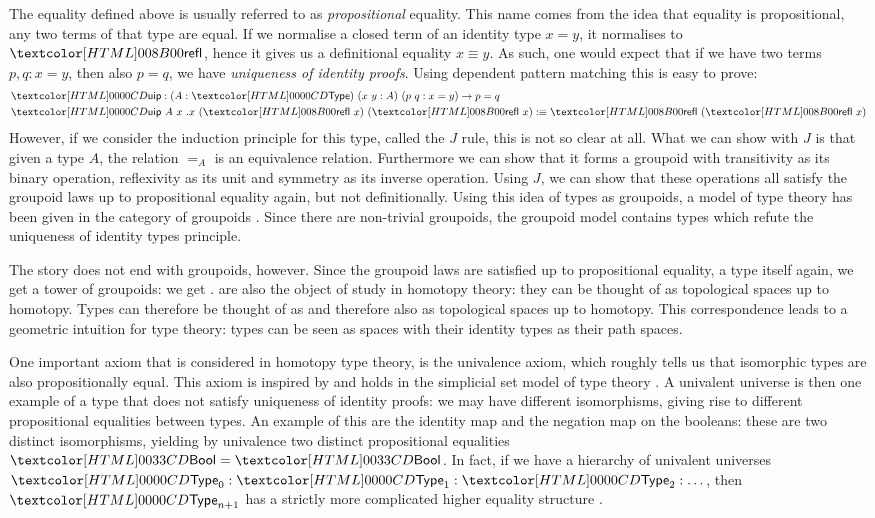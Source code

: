 The equality defined above is usually referred to as
\emph{propositional} equality. This name comes from the idea that
equality is propositional, \ie any two terms of that type are
equal. If we normalise a closed term of an identity type $x = y$, it
normalises to $\refl$, hence it gives us a definitional equality
$x \equiv y$. As such, one would expect that if we have two terms
$p, q : x = y$, then also $p = q$, \ie we have \emph{uniqueness of
  identity proofs}. Using dependent pattern matching this is easy to
prove:
%
\begin{align*}
  &\uip : (A : \Type)\ (x\ y : A)\ (p\ q : x = y) \to p = q \\
  &\uip\ A\ x\ .x\ (\refl\ x)\ (\refl\ x) \ddefeq \refl\ (\refl\ x)
\end{align*}
%
However, if we consider the induction principle for this type, called
the $J$ rule, this is not so clear at all. What we can show with $J$
is that given a type $A$, the relation $=_A$ is an equivalence
relation. Furthermore we can show that it forms a groupoid with
transitivity as its binary operation, reflexivity as its unit and
symmetry as its inverse operation. Using $J$, we can show that these
operations all satisfy the groupoid laws up to propositional equality
again, but not definitionally. Using this idea of types as groupoids,
a model of type theory has been given in the category of groupoids
\cite{Hofmann1998}. Since there are non-trivial groupoids, the
groupoid model contains types which refute the uniqueness of identity
types principle.

The story does not end with groupoids, however. Since the groupoid
laws are satisfied up to propositional equality, a type itself again,
we get a tower of groupoids: we get \inftygrpds. \inftygrpds are also
the object of study in homotopy theory: they can be thought of as
topological spaces up to homotopy. Types can therefore be thought of
as \inftygrpds \cite{VanDenBerg2011,Lumsdaine2009} and therefore also
as topological spaces up to homotopy. This correspondence leads to a
geometric intuition for type theory: types can be seen as spaces with
their identity types as their path spaces.

One important axiom that is considered in homotopy type theory, is the
univalence axiom, which roughly tells us that isomorphic types are
also propositionally equal. This axiom is inspired by and holds in the
simplicial set model of type theory \cite{Kapulkin2012}. A univalent
universe is then one example of a type that does not satisfy
uniqueness of identity proofs: we may have different isomorphisms,
giving rise to different propositional equalities between types. An
example of this are the identity map and the negation map on the
booleans: these are two distinct isomorphisms, yielding by univalence
two distinct propositional equalities $\boolty = \boolty$. In fact, if
we have a hierarchy of univalent universes
$\Type_0 : \Type_1 : \Type_2 : \hdots$, then $\Type_{n+1}$ has a
strictly more complicated higher equality structure
\cite{Kraus2015ii}.

